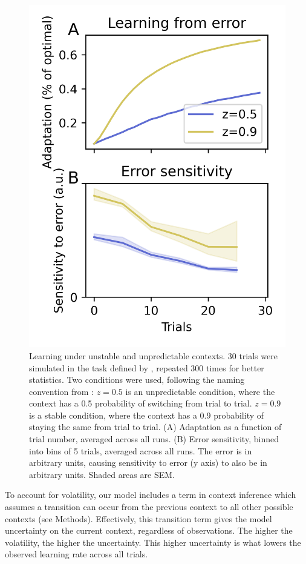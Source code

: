 \documentclass[a4paper,doc,floatsintext,natbib]{apa6}
\begin{document}
\begin{figure}
\centering
\includegraphics{./figures/figure_3.png}
\caption{Learning under unstable and unpredictable contexts. 30 trials were simulated in the task defined by \cite{Herzfeld_memory_2014}, repeated 300 times for better statistics. Two conditions were used, following the naming convention from \cite{Herzfeld_memory_2014}: $z=0.5$ is an unpredictable condition, where the context has a 0.5 probability of switching from trial to trial. $z=0.9$ is a stable condition, where the context has a 0.9 probability of staying the same from trial to trial. (A) Adaptation as a function of trial number, averaged across all runs. (B) Error sensitivity, binned into bins of 5 trials, averaged across all runs. The error is in arbitrary units, causing sensitivity to error (y axis) to also be in arbitrary units. Shaded areas are SEM.}
\label{fig:herzfeld-2014}
\end{figure}

To account for volatility, our model includes a term in context inference which assumes a transition can occur from the previous context to all other possible contexts (see Methods). Effectively, this transition term gives the model uncertainty on the current context, regardless of observations. The higher the volatility, the higher the uncertainty. This higher uncertainty is what lowers the observed learning rate across all trials.
\end{document}
